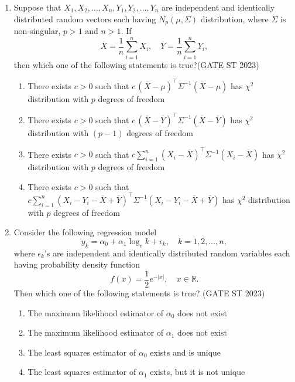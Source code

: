 \documentclass[journal]{IEEEtran}
\begin{document}
\begin{enumerate}[label=\textbf{Q.\arabic*.}, start=1, align=left, itemsep=2em]
\begin{enumerate}[label=\textbf{Q.\arabic*.}, start=11, align=left, itemsep=2em]
\item Suppose that $X_1, X_2, \dots, X_n, Y_1, Y_2, \dots, Y_n$ are independent and identically
distributed random vectors each having $N_p(\mu, \Sigma)$ distribution, where $\Sigma$ is non-singular, $p>1$ and $n>1$. 
If 
\[
\overline{X} = \frac{1}{n} \sum_{i=1}^n X_i, 
\quad
\overline{Y} = \frac{1}{n} \sum_{i=1}^n Y_i,
\]
then which one of the following statements is true?\hfill(GATE ST 2023)
\begin{enumerate}[label=(\Alph*)]
    \item There exists $c>0$ such that $c\, (\overline{X} - \mu)^{\top} \Sigma^{-1} (\overline{X} - \mu)$ has $\chi^2$ distribution with $p$ degrees of freedom
    \item There exists $c>0$ such that $c\, (\overline{X} - \overline{Y})^{\top} \Sigma^{-1} (\overline{X} - \overline{Y})$ has $\chi^2$ distribution with $(p-1)$ degrees of freedom
    \item There exists $c>0$ such that $c \sum_{i=1}^n (X_i - \overline{X})^{\top} \Sigma^{-1} (X_i - \overline{X})$ has $\chi^2$ distribution with $p$ degrees of freedom
    \item There exists $c>0$ such that $c \sum_{i=1}^n (X_i - Y_i - \overline{X} + \overline{Y})^{\top} \Sigma^{-1} (X_i - Y_i - \overline{X} + \overline{Y})$ has $\chi^2$ distribution with $p$ degrees of freedom
\end{enumerate}

\item Consider the following regression model  
\[
y_k = \alpha_0 + \alpha_1 \log_e k + \epsilon_k, \quad k = 1, 2, \dots, n,
\]
where $\epsilon_k$'s are independent and identically distributed random variables each having probability density function  
\[
f(x) = \frac{1}{2} e^{-|x|}, \quad x \in \mathbb{R}.
\]
Then which one of the following statements is true? \hfill(GATE ST 2023) 

\begin{enumerate}[label=(\Alph*)]
    \item The maximum likelihood estimator of $\alpha_0$ does not exist
    \item The maximum likelihood estimator of $\alpha_1$ does not exist
    \item The least squares estimator of $\alpha_0$ exists and is unique
    \item The least squares estimator of $\alpha_1$ exists, but it is not unique
\end{enumerate}



\end{enumerate}
\end{enumerate}
\end{document}
